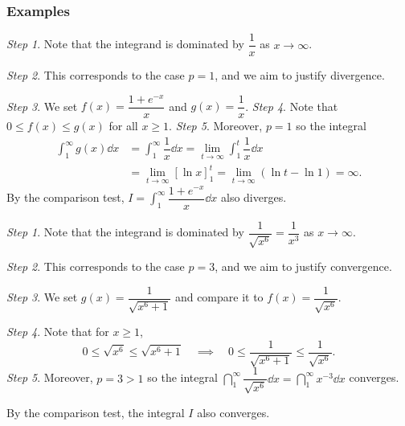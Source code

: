 \subsubsection{Examples}
\begin{ex}[Show that $I = \dint_1^\infty \dfrac{1+e^{-x}}{x} \dd x$ diverges] 

    \textit{Step 1}. Note that the integrand is dominated by $ \dfrac{1}{x} $ as $ x \to \infty $. 
    
    \textit{Step 2}. This corresponds to the case $ p = 1 $, and we aim to justify divergence.
    
    \textit{Step 3}. We set $ f(x) = \dfrac{1 + e^{-x}}{x} $ and $ g(x) = \dfrac{1}{x} $. 
    \textit{Step 4}. Note that $ 0 \leq f(x) \leq g(x) $ for all $ x \geq 1 $. 
    \textit{Step 5}. Moreover, $p = 1$ so the integral 
    \begin{align*}
    \int_1^\infty g(x) \dd x &= \int_1^\infty \dfrac{1}{x} \dd x = \lim_{t \to \infty} \int_1^t \dfrac{1}{x} \dd x \\
    &= \lim_{t \to \infty} \left[\ln x\right]_1^t = \lim_{t \to \infty} (\ln t - \ln 1) = \infty \tag{The same computation as Example 6.5}.
    \end{align*}
    By the comparison test, $\displaystyle I = \int_1^\infty \dfrac{1 + e^{-x}}{x} \dd x$ also diverges.

\end{ex}


\begin{ex}[Apply the comparison test to $I = \dint_1^\infty \dfrac{1}{\sqrt{x^6 + 1}} \dd x$]

    \textit{Step 1}. Note that the integrand is dominated by $\dfrac{1}{\sqrt{x^6}} = \dfrac{1}{x^3}$ as $x \to \infty$. 
    
    \textit{Step 2}. This corresponds to the case $ p = 3 $, and we aim to justify convergence.
    
    \textit{Step 3}. We set $g(x) = \dfrac{1}{\sqrt{x^6 + 1}}$ and compare it to $f(x) = \dfrac{1}{\sqrt{x^6}}$.

    \textit{Step 4}. Note that for $x \geq 1$,
    \[
    0 \leq \sqrt{x^6} \leq \sqrt{x^6 + 1} \quad \implies \quad  0 \leq \dfrac{1}{\sqrt{x^6 + 1}} \leq \dfrac{1}{\sqrt{x^6}}.\]
    \textit{Step 5}. Moreover, $p = 3 > 1$ so the integral $\dint_1^\infty \dfrac{1}{\sqrt{x^6}} \dd x = \dint_1^\infty x^{-3} \dd x$ converges. 

    By the comparison test, the integral $I$ also converges. 
\end{ex}

